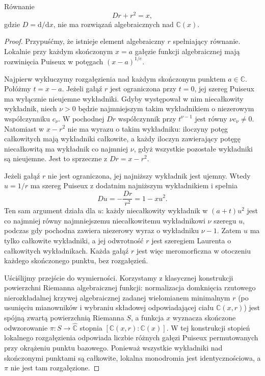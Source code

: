 \begin{lemat}
\label{aa:lem:pv-airy-riccati}
Równanie
\begin{equation}\label{eq:airy-riccati}
Dr+r^2=x,
\end{equation}
gdzie $D=\mathrm d/\mathrm dx$,
nie ma rozwiązań algebraicznych
nad $\mathbb C(x)$.
\end{lemat}
\begin{proof}
Przypuśćmy, że istnieje
element algebraiczny $r$
spełniający równanie.
Lokalnie przy każdym skończonym
$x=a$ gałęzie funkcji
algebraicznej mają rozwinięcia
Puiseux w potęgach
$(x-a)^{1/e}$.

Najpierw wykluczymy rozgałęzienia nad każdym skończonym
punktem $a\in\mathbb C$. Połóżmy $t=x-a$.
Jeżeli gałąź $r$ jest ograniczona przy $t=0$,
jej szereg Puiseux ma wyłącznie nieujemne wykładniki.
Gdyby występował w nim niecałkowity wykładnik,
niech $\nu>0$ będzie najmniejszym takim wykładnikiem
o niezerowym współczynniku $c_\nu$. W pochodnej $Dr$
współczynnik przy $t^{\nu-1}$ jest równy
$\nu c_\nu\ne0$. Natomiast w $x-r^2$ nie ma
wyrazu o takim wykładniku: iloczyny potęg całkowitych
mają wykładniki całkowite, a każdy iloczyn zawierający
potęgę niecałkowitą ma wykładnik co najmniej $\nu$,
gdyż wszystkie pozostałe wykładniki są nieujemne.
Jest to sprzeczne z $Dr=x-r^2$.

Jeżeli gałąź $r$ nie jest ograniczona, jej najniższy
wykładnik jest ujemny. Wtedy $u=1/r$ ma szereg Puiseux
z dodatnim najniższym wykładnikiem i spełnia
\[
 Du=-\frac{Dr}{r^2}=1-xu^2.
\]
Ten sam argument działa dla $u$: każdy niecałkowity
wykładnik w $(a+t)u^2$ jest co najmniej równy
najmniejszemu niecałkowitemu wykładnikowi $\nu$ szeregu $u$,
podczas gdy pochodna zawiera niezerowy wyraz o wykładniku
$\nu-1$. Zatem $u$ ma tylko całkowite wykładniki, a jej
odwrotność $r$ jest szeregiem Laurenta o całkowitych
wykładnikach. Każda gałąź $r$ jest więc meromorficzna
w otoczeniu każdego skończonego punktu, bez rozgałęzień.

Uściślijmy przejście do wymierności. Korzystamy z klasycznej
konstrukcji powierzchni Riemanna algebraicznej funkcji:
normalizacja domknięcia rzutowego nierozkładalnej krzywej
algebraicznej zadanej wielomianem minimalnym $r$
(po usunięciu mianowników i wybraniu składowej odpowiadającej
ciału $\mathbb C(x,r)$) jest spójną zwartą powierzchnią
Riemanna $S$,
a funkcja $x$ wyznacza skończone odwzorowanie
$\pi:S\to\widehat{\mathbb C}$ stopnia
$[\mathbb C(x,r):\mathbb C(x)]$.
W tej konstrukcji stopień lokalnego rozgałęzienia odpowiada
liczbie różnych gałęzi Puiseux permutowanych przy okrążeniu
punktu bazowego. Ponieważ wszystkie wykładniki nad
skończonymi punktami są całkowite, lokalna monodromia jest
identycznościowa, a $\pi$ nie jest tam rozgałęzione.


\end{proof}
